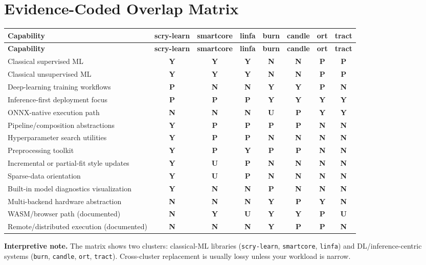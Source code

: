 \documentclass[11pt]{article}
\newcommand{\Y}{\textbf{Y}}
\newcommand{\Part}{\textbf{P}}
\newcommand{\N}{\textbf{N}}
\newcommand{\U}{\textbf{U}}
\begin{document}
\section{Evidence-Coded Overlap Matrix}
\small
\begin{landscape}
\begin{longtable}{p{3.2cm}ccccccc}
\toprule
\textbf{Capability} & \textbf{scry-learn} & \textbf{smartcore} & \textbf{linfa} & \textbf{burn} & \textbf{candle} & \textbf{ort} & \textbf{tract} \\
\midrule
\endfirsthead
\toprule
\textbf{Capability} & \textbf{scry-learn} & \textbf{smartcore} & \textbf{linfa} & \textbf{burn} & \textbf{candle} & \textbf{ort} & \textbf{tract} \\
\midrule
\endhead
Classical supervised ML & \Y & \Y & \Y & \N & \N & \Part & \Part \\
Classical unsupervised ML & \Y & \Y & \Y & \N & \N & \Part & \Part \\
Deep-learning training workflows & \Part & \N & \N & \Y & \Y & \Part & \N \\
Inference-first deployment focus & \Part & \Part & \Part & \Y & \Y & \Y & \Y \\
ONNX-native execution path & \N & \N & \N & \U & \Part & \Y & \Y \\
Pipeline/composition abstractions & \Y & \Part & \Part & \Part & \Part & \N & \N \\
Hyperparameter search utilities & \Y & \Part & \Part & \N & \N & \N & \N \\
Preprocessing toolkit & \Y & \Part & \Y & \Part & \Part & \N & \N \\
Incremental or partial-fit style updates & \Y & \U & \Part & \N & \N & \N & \N \\
Sparse-data orientation & \Y & \U & \Part & \N & \N & \N & \N \\
Built-in model diagnostics visualization & \Y & \N & \N & \Part & \N & \N & \N \\
Multi-backend hardware abstraction & \N & \N & \N & \Y & \Part & \Y & \N \\
WASM/browser path (documented) & \N & \Y & \U & \Y & \Y & \Part & \U \\
Remote/distributed execution (documented) & \N & \N & \N & \Y & \Part & \Part & \N \\
\bottomrule
\end{longtable}
\end{landscape}
\normalsize

\textbf{Interpretive note.} The matrix shows two clusters: classical-ML libraries (\texttt{scry-learn}, \texttt{smartcore}, \texttt{linfa}) and DL/inference-centric systems (\texttt{burn}, \texttt{candle}, \texttt{ort}, \texttt{tract}). Cross-cluster replacement is usually lossy unless your workload is narrow.
\end{document}
